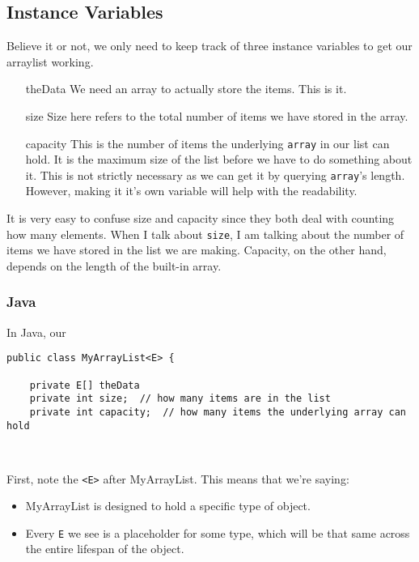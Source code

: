 
\subsection{Instance Variables}

Believe it or not, we only need to keep track of three instance variables to get our arraylist working.

\begin{enumerate}
	\item[theData]  We need an array to actually store the items.  This is it.
	\item[size] Size here refers to the total number of items we have stored in the array.
	\item[capacity]  This is the number of items  the underlying \texttt{array} in our list can hold. It is the maximum size of the list before we have to do something about it. This is not strictly necessary as we can get it by querying \texttt{array}'s length. However, making it it's own variable will help with the readability.
\end{enumerate}

It is very easy to confuse size and capacity since they both deal with counting how many elements.  When I talk about \texttt{size}, I am talking about the number of items we have stored in the list we are making.  Capacity, on the other hand, depends on the length of the built-in array. 

\subsubsection{Java}
In Java, our 

\begin{verbatim}
public class MyArrayList<E> {
	
	private E[] theData
	private int size;  // how many items are in the list
	private int capacity;  // how many items the underlying array can hold
	
	
\end{verbatim}

First, note the \texttt{<E>} after MyArrayList.  This means that we're saying:
\begin{itemize}
	\item MyArrayList is designed to hold a specific type of object.
	\item Every \texttt{E} we see is a placeholder for some type, which will be that same across the entire lifespan of the object.
\end{itemize}


